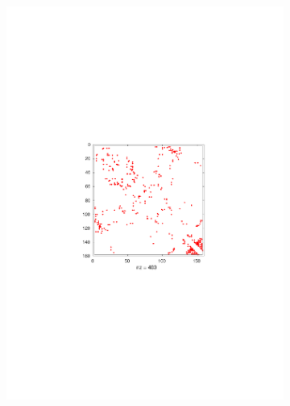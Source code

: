 \documentclass[11pt]{article}\usepackage[]{graphicx}\usepackage[]{color}
\theoremstyle{plain}
\begin{document}
\begin{multicols*}{2}
\begin{figure}[p]
\begin{subfigure}[b]{.5\textwidth}
      \includegraphics[width=\textwidth, trim=2cm 7cm 2cm 7cm, clip]{../figures/DYR_ECOLI_e3_n2_m40_Predicted_Constraints}
      \caption{ }
      \label{fig:fig2}
    \end{subfigure}\\
    \begin{subfigure}[b]{.49\textwidth}

\end{subfigure}
\end{figure}
\end{multicols*}
\end{document}
